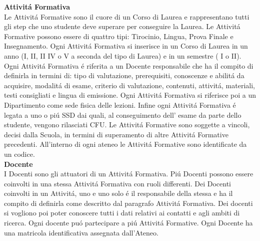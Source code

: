\documentclass[a4paper,12pt,italian,towside]{article}
\begin{document}
\textbf{Attivit\'a Formativa}\\
Le Attivit\'a Formative sono il cuore di un Corso di Laurea e rappresentano tutti gli step che uno studente deve superare per conseguire la Laurea. Le Attivit\'a Formative possono essere di quattro tipi: Tirocinio, Lingua, Prova Finale e Insegnamento. Ogni Attivit\'a Formativa si inserisce in un Corso di Laurea in un anno (I, II, II IV o V a seconda del tipo di Laurea) e in un semestre ( I o II). Ogni Attivit\'a Formativa \'e riferita a un Docente responsabile che ha il compito di definirla in termini di: tipo di valutazione, prerequisiti, conoscenze e abilit\'a da acquisire, modalit\'a di esame, criterio di valutazione, contenuti, attivit\'a, materiali, testi consigliati e lingua di emissione. Ogni Attivit\'a Formativa si riferisce poi a un Dipartimento come sede fisica delle lezioni. Infine ogni Attivit\'a Formativa \'e legata a uno o pi\'u SSD dai quali, al conseguimento dell' esame da parte dello studente, vengono rilasciati CFU. Le Attivit\'a Formative sono soggette a vincoli, decisi dalla Scuola, in termini di superamento di altre Attivit\'a Formative precedenti. All'interno di ogni ateneo le Attivit\'a Formative sono identificate da un codice.\\

\textbf{Docente}\\
I Docenti sono gli attuatori di un Attivit\'a Formativa. Pi\'u Docenti possono essere coinvolti in una stessa Attivit\'a Formativa con ruoli differenti. Dei Docenti coinvolti in un Attivit\'a, uno e uno solo \'e il responsabile della stessa e ha il compito di definirla come descritto dal paragrafo Attivit\'a Formativa. Dei docenti si vogliono poi poter conoscere tutti i dati relativi ai contatti e agli ambiti di ricerca. Ogni docente pu\'o partecipare a pi\'u Attivit\'a Formative. Ogni Docente ha una matricola identificativa assegnata dall'Ateneo.\\


\newpage
\end{document}
